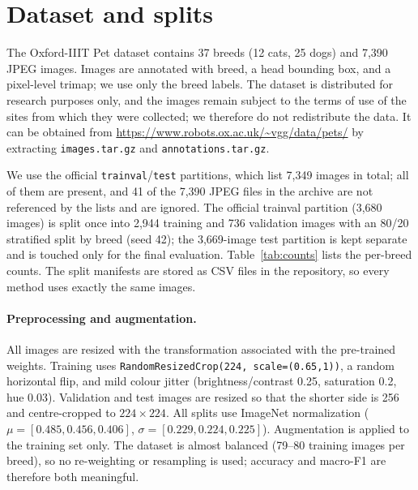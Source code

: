 \documentclass[10pt]{article}
\begin{document}
\section{Dataset and splits}
The Oxford-IIIT Pet dataset \cite{parkhi2012cats} contains 37 breeds (12 cats, 25 dogs)
and 7,390 JPEG images. Images are annotated with breed, a head bounding box, and a
pixel-level trimap; we use only the breed labels. The dataset is distributed for
research purposes only, and the images remain subject to the terms of use of the sites
from which they were collected; we therefore do not redistribute the data. It can be
obtained from \url{https://www.robots.ox.ac.uk/~vgg/data/pets/} by extracting
\texttt{images.tar.gz} and \texttt{annotations.tar.gz}.

We use the official \texttt{trainval}/\texttt{test} partitions, which list 7,349 images
in total; all of them are present, and 41 of the 7,390 JPEG files in the archive are not
referenced by the lists and are ignored. The official
trainval partition (3,680 images) is split once into 2,944 training and 736 validation
images with an 80/20 stratified split by breed (seed 42); the 3,669-image test partition
is kept separate and is touched only for the final evaluation. Table~\ref{tab:counts}
lists the per-breed counts. The split manifests are stored as CSV files in the
repository, so every method uses exactly the same images.

\begin{table}[t]
\centering
\caption{Images per breed in each split. The official test partition is never used for
training or model selection.}
\label{tab:counts}
\scriptsize

\end{table}

\paragraph{Preprocessing and augmentation.}
All images are resized with the transformation associated with the pre-trained weights.
Training uses \texttt{RandomResizedCrop(224, scale=(0.65,1))}, a random horizontal flip,
and mild colour jitter (brightness/contrast 0.25, saturation 0.2, hue 0.03). Validation
and test images are resized so that the shorter side is 256 and centre-cropped to
$224\times224$. All splits use ImageNet normalization
($\mu=[0.485,0.456,0.406]$, $\sigma=[0.229,0.224,0.225]$). Augmentation is applied to
the training set only. The dataset is almost balanced (79--80 training images per
breed), so no re-weighting or resampling is used; accuracy and macro-F1 are therefore
both meaningful.
\end{document}
